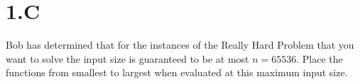 \section{1.C}
    Bob has determined that for the instances of the Really Hard Problem that you want to solve the input size is guaranteed to be at most $n = 65536$. Place the functions from smallest to largest when evaluated at this maximum input size. 